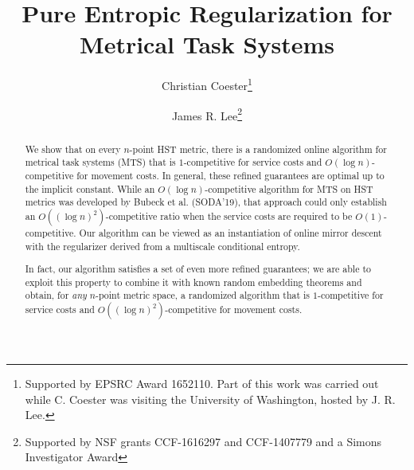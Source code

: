 \documentclass{toc}
\begin{document}
\begin{frontmatter} %
  
%
%

%
%

\title{Pure Entropic Regularization for Metrical Task Systems}

%
%
%
%
%
%
%
%
%
%
%
%


%
%
%
%

%

\author[coester]{Christian Coester\thanks{Supported by EPSRC Award 1652110. Part of this work was carried out while C. Coester was visiting the University of Washington, hosted by J. R. Lee.}}
\author[lee]{James R. Lee\thanks{Supported by NSF grants CCF-1616297 and CCF-1407779 and a Simons Investigator Award}}

%
%
%
%

%
%
%
%
%
%
\begin{abstract}
We show that on every $n$-point HST metric, there is a randomized online
algorithm for metrical task systems (MTS) that is $1$-competitive for service costs and $O(\log n)$-competitive for movement costs.
In general, these refined guarantees are optimal up to the implicit constant.
While an $O(\log n)$-competitive algorithm for MTS on HST metrics was developed by Bubeck et al. (SODA'19),
that approach could only establish an $O((\log n)^2)$-competitive ratio
when the service costs are required to be $O(1)$-competitive.
Our algorithm can be viewed as an instantiation of
online mirror descent with the regularizer derived from a multiscale conditional entropy.

In fact, our algorithm satisfies a set of even more refined guarantees; we are able to exploit this
property to combine it with known random embedding theorems and obtain, for \emph{any} $n$-point metric space,
a randomized algorithm that is $1$-competitive for service costs and $O((\log n)^2)$-competitive
for movement costs.
\end{abstract}

%

\end{frontmatter}

%
%
%
\end{document}
